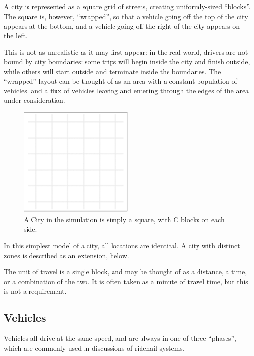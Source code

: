 \documentclass[
  letterpaper,
]{article}
\begin{document}
A city is represented as a square grid of streets, creating
uniformly-sized ``blocks''. The square is, however, ``wrapped'', so that
a vehicle going off the top of the city appears at the bottom, and a
vehicle going off the right of the city appears on the left.

This is not as unrealistic as it may first appear: in the real world,
drivers are not bound by city boundaries: some trips will begin inside
the city and finish outside, while others will start outside and
terminate inside the boundaries. The ``wrapped'' layout can be thought
of as an area with a constant population of vehicles, and a flux of
vehicles leaving and entering through the edges of the area under
consideration.

\begin{figure}

{\centering \includegraphics[width=0.5\textwidth,height=\textheight]{fig1.png}

}

\caption{\label{fig-1}A City in the simulation is simply a square, with
C blocks on each side.}

\end{figure}

In this simplest model of a city, all locations are identical. A city
with distinct zones is described as an extension, below.

The unit of travel is a single block, and may be thought of as a
distance, a time, or a combination of the two. It is often taken as a
minute of travel time, but this is not a requirement.

\hypertarget{vehicles}{%
\subsection{Vehicles}\label{vehicles}}

Vehicles all drive at the same speed, and are always in one of three
``phases'', which are commonly used in discussions of ridehail systems.
\end{document}
